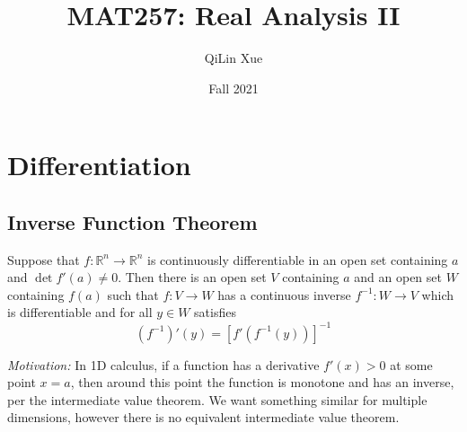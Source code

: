 \documentclass{article}
\title{MAT257: Real Analysis II}
\author{QiLin Xue}
\date{Fall 2021}
\begin{document}
\maketitle
\tableofcontents
\newpage
\section{Differentiation}
\subsection{Inverse Function Theorem}
\begin{theorem}
    Suppose that $f:\mathbb{R}^n \rightarrow \mathbb{R}^n$ is continuously differentiable in an open set containing $a$ and $\det f'(a) \neq 0$. Then there is an open set $V$ containing $a$ and an open set $W$ containing $f(a)$ such that $f:V\rightarrow W$ has a continuous inverse $f^{-1}:W\rightarrow V$ which is differentiable and for all $y\in W$ satisfies
    \begin{equation}
        (f^{-1})'(y) = [f'(f^{-1}(y))]^{-1}
    \end{equation}
\end{theorem}
\textit{Motivation:} In 1D calculus, if a function has a derivative $f'(x)>0$ at some point $x=a$, then around this point the function is monotone and has an inverse, per the intermediate value theorem. We want something similar for multiple dimensions, however there is no equivalent intermediate value theorem.
\end{document}
